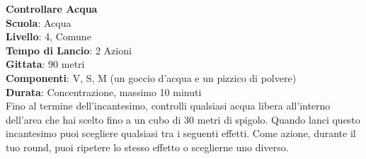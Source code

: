 \begin{multicols}{2}
\medskip\textbf{Controllare Acqua}\\
\textbf{Scuola}: Acqua\\
\textbf{Livello}: 4, Comune\\
\textbf{Tempo di Lancio}: 2 Azioni\\
\textbf{Gittata}: 90 metri\\
\textbf{Componenti}: V, S, M (un goccio d'acqua e un pizzico di polvere)\\
\textbf{Durata}: Concentrazione, massimo 10 minuti\\
Fino al termine dell'incantesimo, controlli qualsiasi acqua libera all'interno dell'area che hai scelto fino a un cubo di 30 metri di spigolo. Quando lanci questo incantesimo puoi scegliere qualsiasi tra i seguenti effetti. Come azione, durante il tuo round, puoi ripetere lo stesso effetto o sceglierne uno diverso.\\


\end{multicols}
